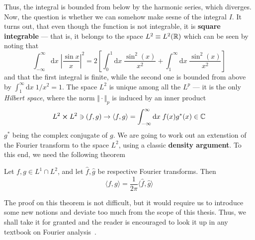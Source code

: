 Thus, the integral is bounded from below by the harmonic series, which diverges.
Now, the question is whether we can somehow make sesne of the integral \(I\).
It turns out, that
even though the function is not integrable, it is \textbf{square integrable} --- that is, it belongs to the
space \(L^2 \equiv L^2(\mathbb{R})\)
which can be seen by noting that
\begin{equation}
    \int_{-\infty }^{\infty} \mathrm{d}x \; \left|\frac{\sin x}x\right|^2  =
    2\left[ \int_{0}^{1} \mathrm{d}x \; \frac{\sin^2(x)}{x^2} + \int_{1}^{\infty } \mathrm{d}x \; \frac{\sin^2(x)}{x^2}   \right]
\end{equation}
and that the first integral is finite, while the second one is bounded from above by \(\int_{1}^{\infty}\mathrm{d}x\;  1/x^2 = 1\).
The space \(L^2\) is unique among all the \(L^p\) --- it is the only \textit{Hilbert space},
where the norm \(\Vert \cdot \Vert_p \) is induced by an inner product
\begin{equation}
    L^2 \cross L^2 \ni (f,g) \to \langle f,g \rangle = \int_{-\infty}^{\infty} \mathrm{d}x \; f(x)g^*(x) \in \mathbb{C}
\end{equation}
\(g^*\) being the complex conjugate of \(g\). We are going to work out an extenstion of the Fourier transform
to the space \(L^2\), using a classic \textbf{density argument}. To this end, we need the following theorem
\begin{theorem}

        Let \(f,g \in L^1 \cap L^2\), and let \(\hat{f},\hat{g}\) be respective Fourier transforms. Then
    \begin{equation*}
        \langle f,g \rangle = \frac{1}{2\pi }\langle \hat{f} ,\hat{g}  \rangle  
    \end{equation*}
\end{theorem}
The proof on this theorem is not difficult, but it would require us to introduce some new notions and deviate
too much from the scope of this thesis. Thus, we shall take it for granted and the reader is encouraged to
look it up in any textbook on Fourier analysis~\autocite{Rudin1987,Stein2011}. 